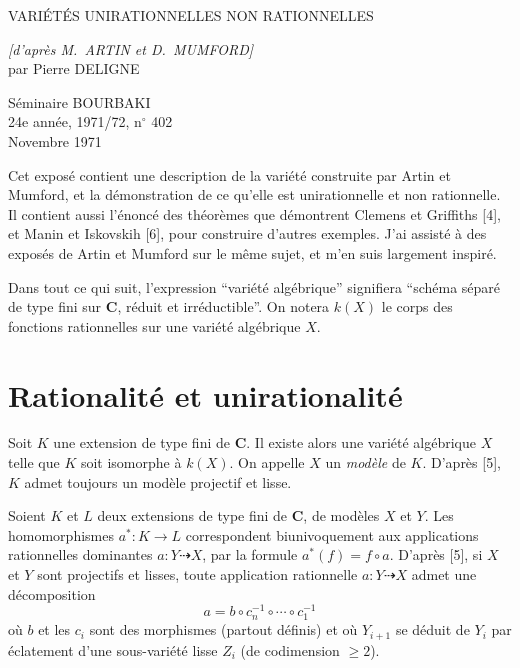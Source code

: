 \documentclass[12pt]{amsart}
\theoremstyle{plain}
\theoremstyle{definition}
\theoremstyle{remark}
\begin{document}
\setcounter{page}{45}

\begin{center}
{\Large VARI\'ET\'ES UNIRATIONNELLES NON RATIONNELLES}
\end{center}

\begin{flushright}
\textit{[d'apr\`es M.~ARTIN et D.~MUMFORD]}\\[4pt]
par Pierre DELIGNE
\end{flushright}

\begin{flushright}
S\'eminaire BOURBAKI\\
24e ann\'ee, 1971/72, n$^\circ$ 402\\
Novembre 1971
\end{flushright}

\bigskip

Cet expos\'e contient une description de la vari\'et\'e construite par Artin et
Mumford, et la d\'emonstration de ce qu'elle est unirationnelle et non rationnelle.
Il contient aussi l'\'enonc\'e des th\'eor\`emes que d\'emontrent Clemens et Griffiths
[4], et Manin et Iskovskih [6], pour construire d'autres exemples. J'ai assist\'e \`a des
expos\'es de Artin et Mumford sur le m\^eme sujet, et m'en suis largement inspir\'e.

Dans tout ce qui suit, l'expression ``vari\'et\'e alg\'ebrique'' signifiera
``sch\'ema s\'epar\'e de type fini sur $\mathbf{C}$, r\'eduit et irr\'eductible''.
On notera $k(X)$ le corps des fonctions rationnelles sur une vari\'et\'e alg\'ebrique $X$.

\section{Rationalit\'e et unirationalit\'e}

Soit $K$ une extension de type fini de $\mathbf{C}$. Il existe alors une vari\'et\'e alg\'ebrique
$X$ telle que $K$ soit isomorphe \`a $k(X)$. On appelle $X$ un \textit{mod\`ele} de $K$.
D'apr\`es [5], $K$ admet toujours un mod\`ele projectif et lisse.

Soient $K$ et $L$ deux extensions de type fini de $\mathbf{C}$, de mod\`eles $X$ et $Y$.
Les homomorphismes $a^*: K \to L$ correspondent biunivoquement aux applications
rationnelles dominantes $a: Y \dashrightarrow X$, par la formule $a^*(f) = f \circ a$.
D'apr\`es [5], si $X$ et $Y$ sont projectifs et lisses, toute application rationnelle
$a: Y \dashrightarrow X$ admet une d\'ecomposition
\begin{equation}\label{eq:1.1}
a = b \circ c_n^{-1} \circ \cdots \circ c_1^{-1}
\end{equation}
o\`u $b$ et les $c_i$ sont des morphismes (partout d\'efinis) et o\`u $Y_{i+1}$ se d\'eduit
de $Y_i$ par \'eclatement d'une sous-vari\'et\'e lisse $Z_i$ (de codimension $\geqslant 2$).
\end{document}
